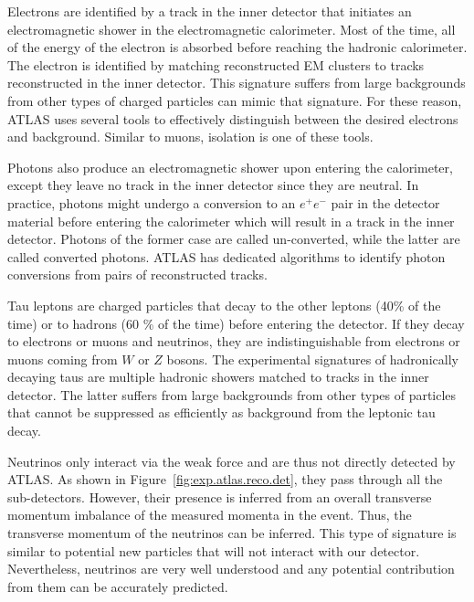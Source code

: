 Electrons are identified by a track in the inner detector that 
initiates  an electromagnetic
shower in the electromagnetic calorimeter. Most of the time,  
all of the energy of the electron is absorbed before reaching the hadronic 
calorimeter.
The electron is identified  by matching reconstructed EM clusters to tracks
reconstructed in the inner detector. 
This signature suffers from 
large backgrounds from other types of charged particles can mimic that 
signature. For these reason, ATLAS uses several tools to effectively 
distinguish between the desired electrons and background.
Similar to muons, isolation is one of these tools.

Photons also produce an electromagnetic shower upon entering the calorimeter, 
except they leave no track in the inner detector since they are neutral.
In practice, photons might undergo a conversion to an $e^+e^-$ pair 
in the detector material before entering the calorimeter which will 
result in a track in the inner detector. Photons of the former case 
are called un-converted, while the latter are called converted photons.
ATLAS has dedicated algorithms to identify photon conversions from 
pairs of reconstructed tracks.%

Tau leptons are charged particles that decay to the other leptons 
(40\% of the time) or to hadrons (60 \% of the time) before entering the detector.
If they decay to electrons or muons and neutrinos, they are indistinguishable from 
electrons or muons coming from $W$ or $Z$ bosons.
The experimental signatures of hadronically decaying taus are
multiple hadronic showers matched to tracks in the inner detector.
The latter suffers from large backgrounds 
from other types of particles that cannot be suppressed 
as efficiently as background from the leptonic tau decay.


Neutrinos only interact via the weak force
and are thus not directly detected by ATLAS.
As shown in Figure~\ref{fig:exp.atlas.reco.det}, 
they pass through all the sub-detectors.
However, their presence is inferred from an overall 
transverse momentum imbalance of the measured momenta in the event.
Thus, the transverse momentum of the neutrinos can be inferred.
This type of signature is similar to potential new particles 
that will not interact with our detector.
Nevertheless, neutrinos are very well understood
and any potential contribution from them can be accurately 
predicted.

